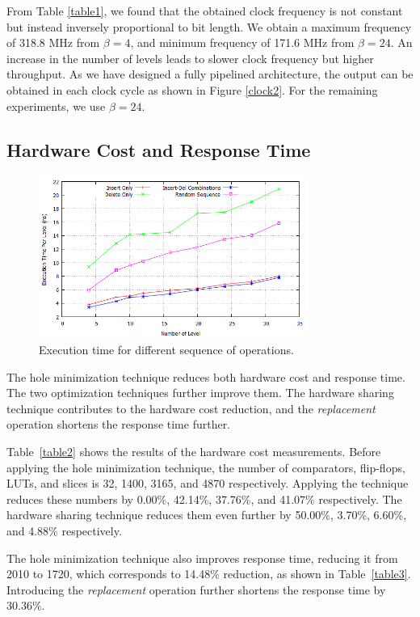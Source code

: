 From Table \ref{table1}, we found that the obtained clock frequency is not constant but instead inversely proportional to bit length.
We obtain a maximum frequency of 318.8 MHz from $\beta = 4$, and minimum frequency of 171.6 MHz from $\beta = 24$.
An increase in the number of levels leads to slower clock frequency but higher throughput.
As we have designed a fully pipelined architecture, the output can be obtained in each clock cycle as shown in Figure \ref{clock2}.
For the remaining experiments, we use $\beta = 24$.

\subsection{Hardware Cost and Response Time}

\begin{figure}[!ht]
  \centering
  \includegraphics[width=8.8cm]{fig/random.png}
      \caption{Execution time for different sequence of operations.}
    \label{random}
\end{figure}

The hole minimization technique reduces both hardware cost and response time.
The two optimization techniques further improve them.
The hardware sharing technique contributes to the hardware cost reduction, and the {\it replacement} operation shortens the response time further.

Table~\ref{table2} shows the results of the hardware cost measurements.
Before applying the hole minimization technique, the number of comparators, flip-flops, LUTs, and slices is 32, 1400, 3165, and 4870 respectively.
Applying the technique reduces these numbers by 0.00\%, 42.14\%, 37.76\%, and 41.07\% respectively.
The hardware sharing technique reduces them even further by 50.00\%, 3.70\%, 6.60\%, and 4.88\% respectively.

The hole minimization technique also improves response time, reducing it from 2010 to 1720, which corresponds to 14.48\% reduction, as shown in Table~\ref{table3}.
Introducing the {\it replacement} operation further shortens the response time by 30.36\%.

